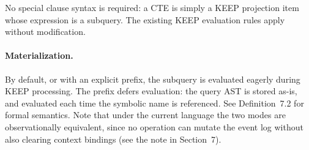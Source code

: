 No special clause syntax is required: a CTE is simply a KEEP projection item whose expression is a subquery. The existing KEEP evaluation rules apply without modification.

\paragraph{Materialization.} By default, or with an explicit  prefix, the subquery is evaluated eagerly during KEEP processing. The  prefix defers evaluation: the query AST is stored as-is, and evaluated each time the symbolic name is referenced. See Definition~7.2 for formal semantics. Note that under the current language the two modes are observationally equivalent, since no operation can mutate the event log without also clearing context bindings (see the note in Section~7).
